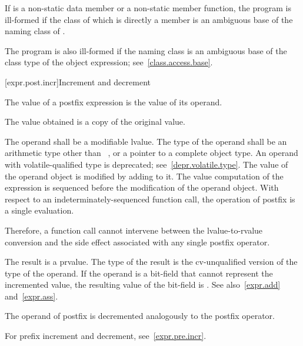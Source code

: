 \pnum
If  is a non-static data member or a non-static member
function, the program is ill-formed if the class of which  is
directly a member is an ambiguous base of
the naming class of .
\begin{note}
The program is also ill-formed if the naming class is an ambiguous base of the class type
of the object expression; see~\ref{class.access.base}.
\end{note}

[expr.post.incr]{Increment and decrement}

\pnum
{}%
%
%
%
The value of a postfix \tcode{++} expression is the value of its
operand.
\begin{note}
The value obtained is a copy of the original value.
\end{note}
The operand shall be a modifiable lvalue. The type of the operand shall
be an arithmetic type other than \cv{}~,
or a pointer to a complete object type.
An operand with volatile-qualified type is deprecated;
see~\ref{depr.volatile.type}.
The value of the operand object is modified
by adding  to it.
The
%
value computation of the \tcode{++} expression is sequenced before the
modification of the operand object. With respect to an
indeterminately-sequenced function call, the operation of postfix
\tcode{++} is
a single evaluation.
\begin{note}
Therefore, a function call cannot intervene between the
lvalue-to-rvalue conversion and the side effect associated with any
single postfix \tcode{++} operator.
\end{note}
The result is a prvalue. The type of the result is the cv-unqualified
version of the type of the operand.
If the operand is a bit-field that cannot represent the incremented value, the
resulting value of the bit-field is
.
See also~\ref{expr.add}
and~\ref{expr.ass}.

\pnum
{}%
%
%
%
The operand of postfix \tcode{\dcr} is decremented analogously to the
postfix \tcode{++} operator.
\begin{note}
For prefix increment and decrement, see~\ref{expr.pre.incr}.
\end{note}

